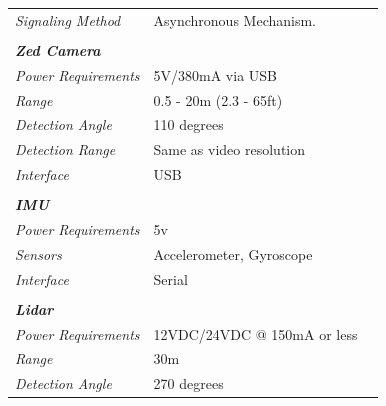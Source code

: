 \documentclass[]{article}
\begin{document}
\begin{table}[H]
\begin{tabular}{lll}
		\textit{Signaling Method}         & Asynchronous Mechanism.                                          &  \\
		\textit{}                         &                                                                  &  \\
		\textit{\textbf{Zed Camera}}      &                                                                  &  \\
		\textit{Power Requirements}       & 5V/380mA via USB                                                 &  \\
		\textit{Range}                    & 0.5 - 20m (2.3 - 65ft)                                           &  \\
		\textit{Detection Angle}          & 110 degrees                                                      &  \\
		\textit{Detection Range}          & Same as video resolution                                         &  \\
		\textit{Interface}                & USB                                                              &  \\
		\textit{}                         &                                                                  &  \\
		\textit{\textbf{IMU}}             &                                                                  &  \\
		\textit{Power Requirements}       & 5v                                                               &  \\
		\textit{Sensors}                  & Accelerometer, Gyroscope                                         &  \\
		\textit{Interface}                & Serial                                                           &  \\
		\textit{}                         &                                                                  &  \\
		\textit{\textbf{Lidar}}           &                                                                  &  \\
		\textit{Power Requirements}       & 12VDC/24VDC @ 150mA or less                                      &  \\
		\textit{Range}                    & 30m                                                              &  \\
		\textit{Detection Angle}          & 270 degrees                                                      &  \\

\end{tabular}
\end{table}
\end{document}
